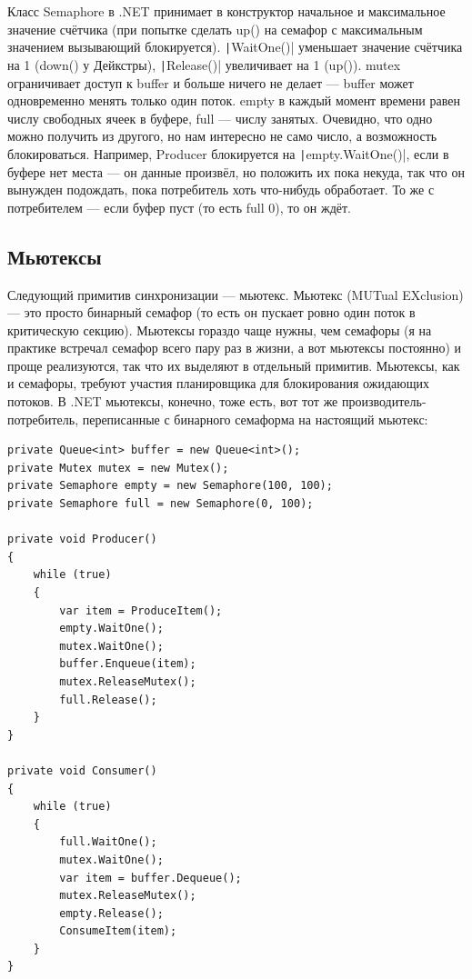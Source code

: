 \documentclass[a5paper]{article}
\begin{document}
Класс Semaphore в .NET принимает в конструктор начальное и максимальное значение счётчика (при попытке сделать up() на семафор с максимальным значением вызывающий блокируется). \texttt|WaitOne()| уменьшает значение счётчика на 1 (down() у Дейкстры), \texttt|Release()| увеличивает на 1 (up()). mutex ограничивает доступ к buffer и больше ничего не делает --- buffer может одновременно менять только один поток. empty в каждый момент времени равен числу свободных ячеек в буфере, full --- числу занятых. Очевидно, что одно можно получить из другого, но нам интересно не само число, а возможность блокироваться. Например, Producer блокируется на \texttt|empty.WaitOne()|, если в буфере нет места --- он данные произвёл, но положить их пока некуда, так что он вынужден подождать, пока потребитель хоть что-нибудь обработает. То же с потребителем --- если буфер пуст (то есть full 0), то он ждёт.

\subsection{Мьютексы}

Следующий примитив синхронизации --- мьютекс. Мьютекс (MUTual EXclusion) --- это просто бинарный семафор (то есть он пускает ровно один поток в критическую секцию). Мьютексы гораздо чаще нужны, чем семафоры (я на практике встречал семафор всего пару раз в жизни, а вот мьютексы постоянно) и проще реализуются, так что их выделяют в отдельный примитив. Мьютексы, как и семафоры, требуют участия планировщика для блокирования ожидающих потоков. В .NET мьютексы, конечно, тоже есть, вот тот же производитель-потребитель, переписанные с бинарного семаформа на настоящий мьютекс:

\begin{verbatim}
private Queue<int> buffer = new Queue<int>();
private Mutex mutex = new Mutex();
private Semaphore empty = new Semaphore(100, 100);
private Semaphore full = new Semaphore(0, 100);

private void Producer()
{
    while (true)
    {
        var item = ProduceItem();
        empty.WaitOne();
        mutex.WaitOne();
        buffer.Enqueue(item);
        mutex.ReleaseMutex();
        full.Release();
    }
}

private void Consumer()
{
    while (true)
    {
        full.WaitOne();
        mutex.WaitOne();
        var item = buffer.Dequeue();
        mutex.ReleaseMutex();
        empty.Release();
        ConsumeItem(item);
    }
}
\end{verbatim}
\end{document}
